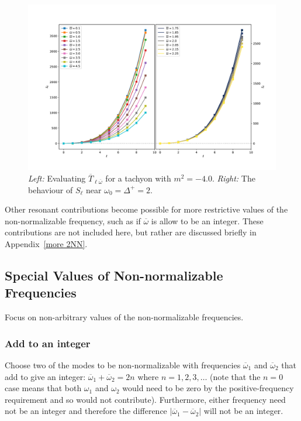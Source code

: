 \documentclass[letterpaper,11pt]{article}
\newcommand{\oone}{\overline{\omega}_1}
\newcommand{\otwo}{\overline{\omega}_2}
\newcommand{\ob}{\overline{\omega}}
\begin{document}
\begin{figure}[h]
\centering
\includegraphics[width=\textwidth]{./figures/NN_equalfreq_sourceterms_m-4_0+zoom}
\caption{{\it Left:} Evaluating $\overline{T}_{\ell \ob}$ for a tachyon with $m^2 = -4.0$. {\it Right:} The behaviour of $S_\ell$ near $\omega_0 = \Delta^+ =  2$.}
\label{fig:equal_frequency_m-4_0}
\end{figure}

Other resonant contributions become possible for more restrictive values of the non-normalizable frequency, such as if $\ob$ is allow to be an integer. These contributions are not included here, but rather are discussed briefly in Appendix~\ref{more 2NN}.

\subsection{Special Values of Non-normalizable Frequencies}

Focus on non-arbitrary values of the non-normalizable frequencies.

\subsubsection{Add to an integer}
\label{ssec: add to integer}

Choose two of the modes to be non-normalizable with frequencies $\oone$ and $\otwo$ that add to give an integer: $\oone+ \otwo = 2n$ where $n = 1, 2, 3, \ldots$ (note that the $n = 0$ case means that both $\omega_1$ and $\omega_2$ would need to be zero by the positive-frequency requirement and so would not contribute). Furthermore, either frequency need not be an integer and therefore the difference $|\oone - \otwo|$ will not be an integer. 
\end{document}
